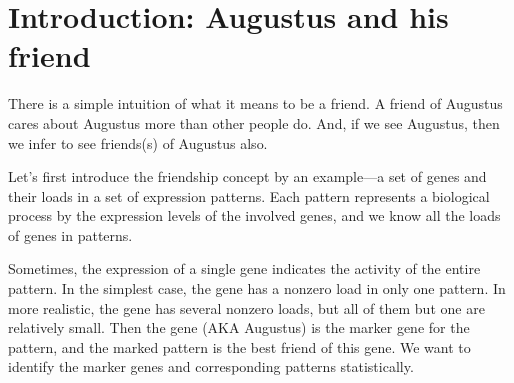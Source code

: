 \documentclass{llncs}
\begin{document}
\begin{abstract}

\textcolor{green}{We define a tag's most friendly collection as a collection that pays maximal rank-normalized attention to the tag.}
\textcolor{blue}{ -- we will return here --} \textcolor{purple}{
Suppose we have a set of {\tag}s and a set of fuzzy set of {\tag}s, which we will refer to as {\collection}s, and we have the {\tag}-to-{\collection} relation quantified as a scalar for each $\left( {\tag},{\collection}\right)$ pair. An example is: {\tag}s are genes, {\collection}s are gene expression patterns, and the scalars are loads of the genes in the patterns. Sometimes, an observation that a gene is expressed implies the expression of a particular pattern (the simplest case is: the gene has nonzero load only in that pattern). If so, we say that the gene marks the pattern. Here we describe a statistical test that identifies pairs of a marker {\tag} and the marked {\collection}. The test is based on rank statistics and it does not rely on propositions about the distribution of the relation quantity. The marked {\collection} is referred to as the {\tag}'s best friend, and the test is named "the best friends test" or "the gene's best friends test". The statistics naturally expand to the case when a {\tag} selects (separates) a subset of {\collection}s, thus having more than one best friend. The code (currently, only R) is available at \url{https://github.com/favorov/best-friends}
}
\end{abstract}
%
\section{Introduction: Augustus and his friend}

There is a simple intuition of what it means to be a friend. A friend of Augustus cares about Augustus more than other people do. And, if we see Augustus, then we infer to see friends(s) of Augustus also. 

\textcolor{airforceblue}{Let's first introduce the friendship concept by an example---a set of genes and their loads in a set of expression patterns. Each pattern represents a biological process by the expression levels of the involved genes, and we know all the loads of genes in patterns.}

Sometimes, the expression of a single gene indicates the activity of the entire pattern. In the simplest case, the gene has a nonzero load in only one pattern. In more realistic, the gene has several nonzero loads, but all of them but one are relatively small. Then the gene (AKA Augustus) is the marker gene for the pattern, and the marked pattern is the best friend of this gene. We want to identify the marker genes and corresponding patterns statistically.  
\end{document}
